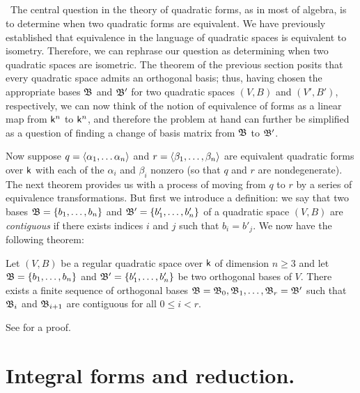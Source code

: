 \subsection{}~The central question in the theory of quadratic forms, as in most
of algebra, is to determine when two quadratic forms are equivalent. We have
previously established that equivalence in the language of quadratic spaces is
equivalent to isometry. Therefore, we can rephrase our question as determining
when two quadratic spaces are isometric. The theorem of the previous section
posits that every quadratic space admits an orthogonal basis; thus, having
chosen the appropriate bases \(\mathfrak{B}\) and \(\mathfrak{B}'\) for two quadratic spaces
\((V, B)\) and \((V', B')\), respectively, we can now think of the notion of
equivalence of forms as a linear map from \(\mathsf{k}^n\) to \(\mathsf{k}^n\), and
therefore the problem at hand can further be simplified as a question of finding
a change of basis matrix from \(\mathfrak{B}\) to
\(\mathfrak{B}'\).\label{sec:contiguous-bases}

Now suppose \(q = \langle \alpha_1, \dots \alpha_n \rangle\) and \(r =
\langle \beta_1, \dots, \beta_n \rangle\) are equivalent quadratic forms over
\(\mathsf{k}\) with each of the \(\alpha_i\) and \(\beta_i\) nonzero (so that \(q\)
and \(r\) are nondegenerate). The next theorem provides us with a process of
moving from \(q\) to \(r\) by a series of equivalence transformations. But first
we introduce a definition: we say that two bases \(\mathfrak{B} = \{b_1, \dots,
b_n\}\) and \(\mathfrak{B}' = \{b_1', \dots, b_n'\}\) of a quadratic space \((V, B)\)
are \emph{contiguous} if there exists indices \(i\) and \(j\) such that \(b_i =
b'_j\). We now have the following theorem:

\begin{theorem}
  Let \((V, B)\) be a regular quadratic space over \(\mathsf{k}\) of dimension \(n
  \geq 3\) and let \(\mathfrak{B} = \{b_1, \dots, b_n\}\) and \(\mathfrak{B}' = \{b_1',
  \dots, b_n'\}\) be two orthogonal bases of \(V\). There exists a finite
  sequence of orthogonal bases \(\mathfrak{B} = \mathfrak{B}_0, \mathfrak{B}_1, \dots, \mathfrak{B}_r =
  \mathfrak{B}'\) such that \(\mathfrak{B}_i\) and \(\mathfrak{B}_{i+1}\) are contiguous for all
  \(0 \leq i < r\).
\end{theorem}

See \cite[pp.~30--31]{serre2012course} for a proof.

\section{Integral forms and reduction.}

